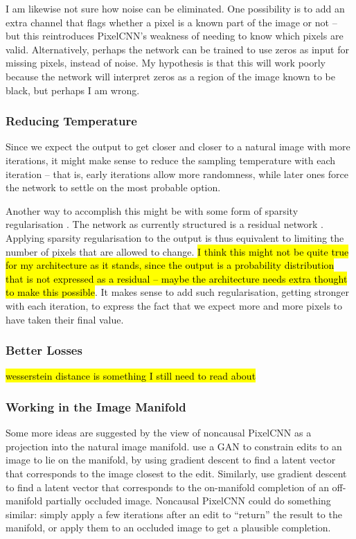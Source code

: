 \documentclass[10pt,a4paper]{article}
\newcommand{\nquote}[1]{``{#1}''}
\begin{document}
I am likewise not sure how noise can be eliminated. One possibility is to add an extra channel that flags whether a pixel is a known part of the image or not -- but this reintroduces PixelCNN's weakness of needing to know which pixels are valid. Alternatively, perhaps the network can be trained to use zeros as input for missing pixels, instead of noise. My hypothesis is that this will work poorly because the network will interpret zeros as a region of the image known to be black, but perhaps I am wrong.

\subsubsection{Reducing Temperature}

Since we expect the output to get closer and closer to a natural image with more iterations, it might make sense to reduce the sampling temperature with each iteration -- that is, early iterations allow more randomness, while later ones force the network to settle on the most probable option.

Another way to accomplish this might be with some form of sparsity regularisation \cite{??}. The network as currently structured is a residual network \cite{resnet}. Applying sparsity regularisation to the output is thus equivalent to limiting the number of pixels that are allowed to change. \hl{I think this might not be quite true for my architecture as it stands, since the output is a probability distribution that is not expressed as a residual -- maybe the architecture needs extra thought to make this possible}. It makes sense to add such regularisation, getting stronger with each iteration, to express the fact that we expect more and more pixels to have taken their final value.

\subsubsection{Better Losses}

\hl{wesserstein distance is something I still need to read about}

\subsubsection{Working in the Image Manifold}

Some more ideas are suggested by the view of noncausal PixelCNN as a projection into the natural image manifold. \cite{manifoldmanipulation} use a GAN to constrain edits to an image to lie on the manifold, by using gradient descent to find a latent vector that corresponds to the image closest to the edit. Similarly, \cite{imageinpainting} use gradient descent to find a latent vector that corresponds to the on-manifold completion of an off-manifold partially occluded image. Noncausal PixelCNN could do something similar: simply apply a few iterations after an edit to \nquote{return} the result to the manifold, or apply them to an occluded image to get a plausible completion.
\end{document}
